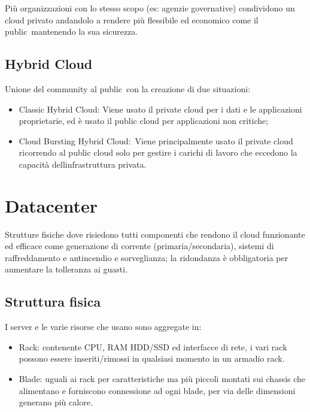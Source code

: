 \documentclass[
]{article}
\providecommand{\tightlist}{%
  \setlength{\itemsep}{0pt}\setlength{\parskip}{0pt}}
\begin{document}
{Più organizzazioni con lo stesso scopo (es: agenzie governative)
condividono un cloud privato andandolo a rendere più flessibile ed
economico come il }{public}{~mantenendo la sua sicurezza.}

{}

\subsection{\texorpdfstring{{Hybrid
Cloud}}{Hybrid Cloud}}\label{h.o9uu245i5d5n}

{Unione del community al }{public}{~con la creazione di due situazioni:}

\begin{itemize}
\tightlist
\item
  {Classic Hybrid Cloud}{: Viene usato il private cloud per i dati e le
  applicazioni proprietarie, ed è usato il public cloud per applicazioni
  non critiche;}
\item
  {Cloud Bursting Hybrid Cloud:}{~Viene principalmente usato il private
  cloud ricorrendo al public cloud solo per gestire i carichi di lavoro
  che eccedono la capacità dell\textquotesingle infrastruttura privata.}
\end{itemize}

{}

{}

\section{\texorpdfstring{{Datacenter}}{Datacenter}}\label{h.jkz5svsorpc2}

{Strutture fisiche dove risiedono tutti componenti che rendono il cloud
funzionante ed efficace come generazione di corrente
(primaria/secondaria), sistemi di raffreddamento e antincendio e
sorveglianza; la ridondanza è obbligatoria per aumentare la tolleranza
ai guasti.}

{}

\subsection{\texorpdfstring{{Struttura
fisica}}{Struttura fisica}}\label{h.sqab6b7kvipj}

{I server e le varie risorse che usano sono aggregate in:}

\begin{itemize}
\tightlist
\item
  {Rack}{: contenente CPU, RAM HDD/SSD ed interfacce di rete, i vari
  rack possono essere inseriti/rimossi in qualsiasi momento in un
  armadio rack.}
\item
  {Blade}{: uguali ai rack per caratteristiche ma più piccoli montati
  sui chassis che alimentano e forniscono connessione ad ogni blade, per
  via delle dimensioni generano più calore.}
\end{itemize}
\end{document}
